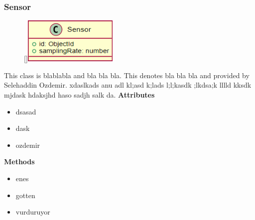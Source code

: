 \subsubsection{Sensor}
\begin{figure}
    \raisebox{0pt}[\dimexpr{}\baselineskip\relax]{\includegraphics[width=4.5cm]{classes/workspace-management/3.png}}
\end{figure} 
\par
This class is blablabla and bla bla bla. This denotes bla bla bla and provided by Selehaddin Ozdemir. xdaslkads anu adl kl;asd k;lads l;l;kasdk ;lkdsa;k lllld kksdk mjdask hdaksjhd haso sadjh salk da.
\newline
\newline
\textbf{Attributes}
\begin{itemize}
    \item dsasad
    \item dask
    \item ozdemir
\end{itemize}
\textbf{Methods}
\begin{itemize}
    \item enes
    \item gotten
    \item vurduruyor
\end{itemize}

